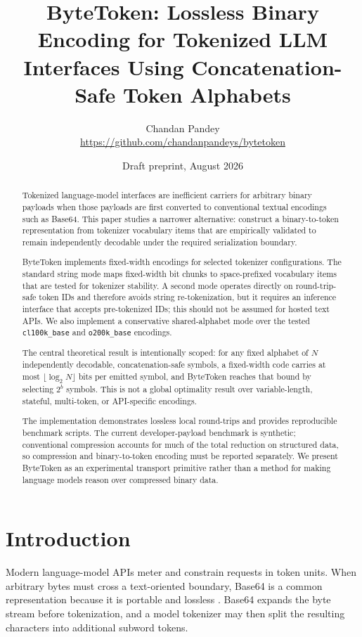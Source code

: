 \documentclass[11pt,a4paper]{article}
\title{ByteToken: Lossless Binary Encoding for Tokenized LLM Interfaces Using Concatenation-Safe Token Alphabets}
\author{Chandan Pandey\\\url{https://github.com/chandanpandeys/bytetoken}}
\date{Draft preprint, August 2026}
\begin{document}
\maketitle

\begin{abstract}
Tokenized language-model interfaces are inefficient carriers for arbitrary binary payloads when those payloads are first converted to conventional textual encodings such as Base64. This paper studies a narrower alternative: construct a binary-to-token representation from tokenizer vocabulary items that are empirically validated to remain independently decodable under the required serialization boundary.

ByteToken implements fixed-width encodings for selected tokenizer configurations. The standard string mode maps fixed-width bit chunks to space-prefixed vocabulary items that are tested for tokenizer stability. A second mode operates directly on round-trip-safe token IDs and therefore avoids string re-tokenization, but it requires an inference interface that accepts pre-tokenized IDs; this should not be assumed for hosted text APIs. We also implement a conservative shared-alphabet mode over the tested \texttt{cl100k\_base} and \texttt{o200k\_base} encodings.

The central theoretical result is intentionally scoped: for any fixed alphabet of \(N\) independently decodable, concatenation-safe symbols, a fixed-width code carries at most \(\lfloor \log_2 N \rfloor\) bits per emitted symbol, and ByteToken reaches that bound by selecting \(2^b\) symbols. This is not a global optimality result over variable-length, stateful, multi-token, or API-specific encodings.

The implementation demonstrates lossless local round-trips and provides reproducible benchmark scripts. The current developer-payload benchmark is synthetic; conventional compression accounts for much of the total reduction on structured data, so compression and binary-to-token encoding must be reported separately. We present ByteToken as an experimental transport primitive rather than a method for making language models reason over compressed binary data.
\end{abstract}

\section{Introduction}

Modern language-model APIs meter and constrain requests in token units. When arbitrary bytes must cross a text-oriented boundary, Base64 is a common representation because it is portable and lossless \cite{rfc4648}. Base64 expands the byte stream before tokenization, and a model tokenizer may then split the resulting characters into additional subword tokens.
\end{document}
